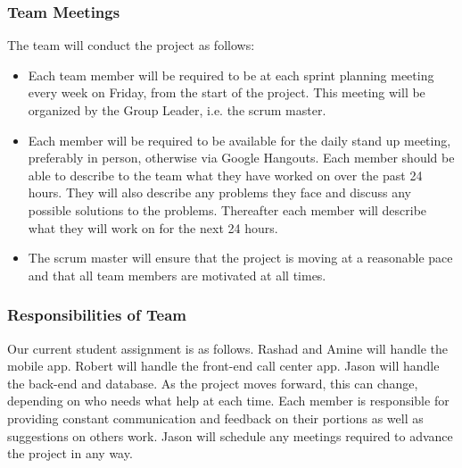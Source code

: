 \documentclass[a4paper,12pt]{article}
\begin{document}
\subsubsection{Team Meetings}
The team will conduct the project as follows:
\begin{itemize}
\setlength\itemsep{0em}
\item Each team member will be required to be at each sprint planning meeting every week on Friday, from the start of the project. This meeting will be organized by the Group Leader, i.e. the scrum master.
\item Each member will be required to be available for the daily stand up meeting, preferably in person, otherwise via Google Hangouts. Each member should be able to describe to the team what they have worked on over the past 24 hours. They will also describe any problems they face and discuss any possible solutions to the problems. Thereafter each member will describe what they will work on for the next 24 hours. 
\item The scrum master will ensure that the project is moving at a reasonable pace and that all team members are motivated at all times.
\end{itemize}
\subsubsection{Responsibilities of Team}
Our current student assignment is as follows. Rashad and Amine will handle the mobile app. Robert will handle the front-end call center app. Jason will handle the back-end and database. As the project moves forward, this can change, depending on who needs what help at each time. Each member is responsible for providing constant communication and feedback on their portions as well as suggestions on others work. Jason will schedule any meetings required to advance the project in any way.
\newpage
\end{document}
